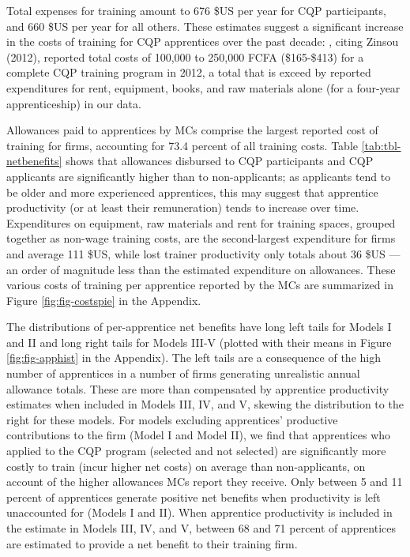 \documentclass[
  a4paper, twoside, 12pt]{book}
\begin{document}
Total expenses for training amount to 676 \$US per year for CQP participants, and 660 \$US per year for all others. These estimates suggest a significant increase in the costs of training for CQP apprentices over the past decade: \textcite{david-gnahoui2017}, citing Zinsou (2012), reported total costs of 100,000 to 250,000 FCFA (\$165-\$413) for a complete CQP training program in 2012, a total that is exceed by reported expenditures for rent, equipment, books, and raw materials alone (for a four-year apprenticeship) in our data.

Allowances paid to apprentices by MCs comprise the largest reported cost of training for firms, accounting for 73.4 percent of all training costs. Table \ref{tab:tbl-netbenefits} shows that allowances disbursed to CQP participants and CQP applicants are significantly higher than to non-applicants; as applicants tend to be older and more experienced apprentices, this may suggest that apprentice productivity (or at least their remuneration) tends to increase over time. Expenditures on equipment, raw materials and rent for training spaces, grouped together as non-wage training costs, are the second-largest expenditure for firms and average 111 \$US, while lost trainer productivity only totals about 36 \$US --- an order of magnitude less than the estimated expenditure on allowances. These various costs of training per apprentice reported by the MCs are summarized in Figure \ref{fig:fig-costspie} in the Appendix.

The distributions of per-apprentice net benefits have long left tails for Models I and II and long right tails for Models III-V (plotted with their means in Figure \ref{fig:fig-apphist} in the Appendix). The left tails are a consequence of the high number of apprentices in a number of firms generating unrealistic annual allowance totals. These are more than compensated by apprentice productivity estimates when included in Models III, IV, and V, skewing the distribution to the right for these models. For models excluding apprentices' productive contributions to the firm (Model I and Model II), we find that apprentices who applied to the CQP program (selected and not selected) are significantly more costly to train (incur higher net costs) on average than non-applicants, on account of the higher allowances MCs report they receive. Only between 5 and 11 percent of apprentices generate positive net benefits when productivity is left unaccounted for (Models I and II). When apprentice productivity is included in the estimate in Models III, IV, and V, between 68 and 71 percent of apprentices are estimated to provide a net benefit to their training firm.
\end{document}
